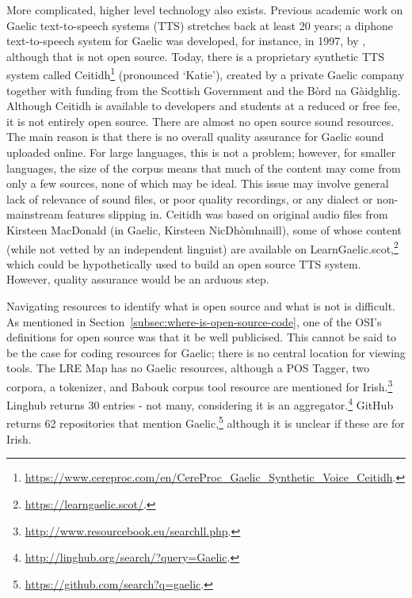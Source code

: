  More complicated, higher level technology also exists. Previous academic work on Gaelic text-to-speech systems (TTS) stretches back at least 20 years; a diphone text-to-speech system for Gaelic was developed, for instance, in 1997, by \citet{wolters1997diphone}, although that is not open source. Today, there is a proprietary synthetic TTS system called Ceitidh\footnote{\href{https://www.cereproc.com/en/CereProc_Gaelic_Synthetic_Voice_Ceitidh}{https://www.cereproc.com/en/CereProc\_Gaelic\_Synthetic\_Voice\_Ceitidh}. } (pronounced `Katie'), created by a private Gaelic company together with funding from the Scottish Government and the B\`ord na G\`aidghlig. Although Ceitidh is available to developers and students at a reduced or free fee, it is not entirely open source. There are almost no open source sound resources. The main reason is that there is no overall quality assurance for Gaelic sound uploaded online. For large languages, this is not a problem; however, for smaller languages, the size of the corpus means that much of the content may come from only a few sources, none of which may be ideal. This issue may involve general lack of relevance of sound files, or poor quality recordings, or any dialect or non-mainstream features slipping in. Ceitidh was based on original audio files from Kirsteen MacDonald (in Gaelic, Kirsteen NicDh\`{o}mhnaill), some of whose content (while not vetted by an independent linguist) are available on LearnGaelic.scot,\footnote{\href{https://learngaelic.scot/}{https://learngaelic.scot/}. } which could be hypothetically used to build an open source TTS system. However, quality assurance would be an arduous step.

Navigating resources to identify what is open source and what is not is difficult. As mentioned in Section~\ref{subsec:where-is-open-source-code}, one of the OSI's definitions for open source was that it be well publicised. This cannot be said to be the case for coding resources for Gaelic; there is no central location for viewing tools. The LRE Map has no Gaelic resources, although a POS Tagger, two corpora, a tokenizer, and Babouk corpus tool resource are mentioned for Irish.\footnote{\href{http://www.resourcebook.eu/searchll.php}{http://www.resourcebook.eu/searchll.php}. } Linghub returns 30 entries - not many, considering it is an aggregator.\footnote{\href{http://linghub.org/search/?query=Gaelic}{http://linghub.org/search/?query=Gaelic}. } GitHub returns 62 repositories that mention Gaelic,\footnote{\href{https://github.com/search?q=gaelic}{https://github.com/search?q=gaelic}. } although it is unclear if these are for Irish.

